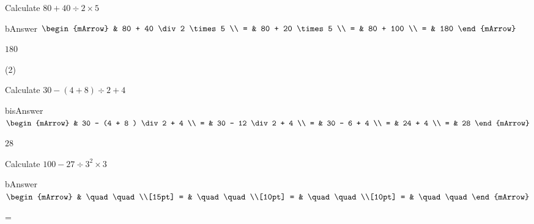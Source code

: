 \begin{mtask}[resume]
   \task \begin{exercise} Calculate $ 80 + 40 \div 2 \times 5    $
           \begin{envOut}[height=6cm]{bAnswer}
             $\begin{mArrow} 
			       & 80 + 40 \div 2 \times 5               \\
                 = & 80 + 20  \times 5                    \\
		   		 = & 80 + 100                             \\
				 = & 180 
              \end{mArrow}$
            \begin{shortsolution}  
			     $180$
			\end{shortsolution}				 
           \end{envOut}
         \end{exercise}
\end{mtask}

\begin{mtask}[resume](2)		 
   \task \begin{exercise} Calculate $ 30 - (4 + 8 ) \div 2  + 4    $
           \begin{envOut}[height=6cm]{bisAnswer}
             $\begin{mArrow} 
			       & 30 - (4 + 8 ) \div 2  + 4               \\
                 = & 30 - 12 \div  2 + 4                     \\
		   		 = & 30 - 6 +  4                             \\
				 = & 24 + 4                                  \\
				 = & 28 
              \end{mArrow}$
            \begin{shortsolution}  
			     $28$
			\end{shortsolution}				 
           \end{envOut}
         \end{exercise}
		 
   \task \begin{exercise} Calculate $ 100 - 27 \div 3^2  \times 3  $
           \begin{envOut}[height=6cm]{bAnswer}
             $\begin{mArrow} 
			       & \quad \quad              \\[15pt]
                 = & \quad \quad              \\[10pt]
		   		 = & \quad \quad              \\[10pt]
				 = & \quad \quad 
              \end{mArrow}$
            \begin{shortsolution}  
			     =$ \quad \quad \quad \quad$
			\end{shortsolution}				 
           \end{envOut}
         \end{exercise}
\end{mtask}

